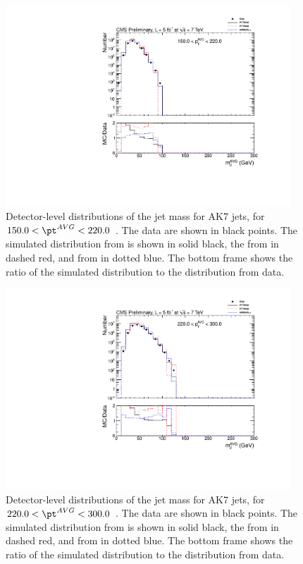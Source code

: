 \begin{figure}[htbp]
\centering
\includegraphics[width=0.95\textwidth]{figs/histAK7MjetVsPtAvg_rawDataMCComparisons_pt_3}
\caption{Detector-level distributions of the jet mass for AK7 jets,
for $150.0 < \pt^{AVG} < 220.0$ \GeVc. The data are shown in black points.
The simulated distribution from \PYTHIA is shown in solid black, 
the from \PYTHIAEIGHT in dashed red, and from \HERWIG in dotted blue. 
The bottom frame shows the ratio of the simulated distribution
to the distribution from data. 
\label{figs:histAK7MjetVsPtAvg_rawDataMCComparisons_pt_3}}
\end{figure}



\begin{figure}[htbp]
\centering
\includegraphics[width=0.95\textwidth]{figs/histAK7MjetVsPtAvg_rawDataMCComparisons_pt_4}
\caption{Detector-level distributions of the jet mass for AK7 jets,
for $220.0 < \pt^{AVG} < 300.0$ \GeVc. The data are shown in black points.
The simulated distribution from \PYTHIA is shown in solid black, 
the from \PYTHIAEIGHT in dashed red, and from \HERWIG in dotted blue. 
The bottom frame shows the ratio of the simulated distribution
to the distribution from data. 
\label{figs:histAK7MjetVsPtAvg_rawDataMCComparisons_pt_4}}
\end{figure}



